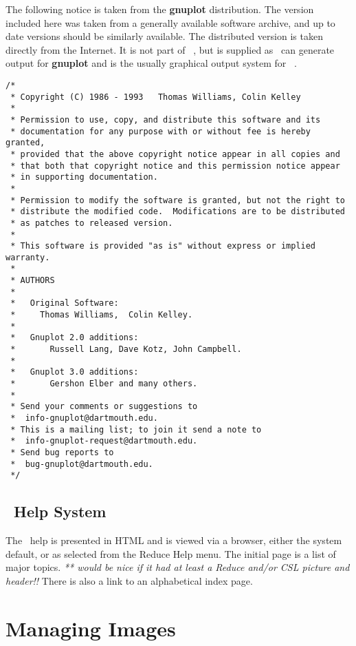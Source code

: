 The following notice is taken from the {\bf gnuplot} distribution.  The
version included here was taken from a generally available software
archive, and up to date versions should be similarly available.  
The distributed version is taken directly from the Internet.  It is not
part of \REDUCE\ , but is supplied as \REDUCE\  can generate output for {\bf
gnuplot} and is the usually graphical output system for \REDUCE\ .

{\small
\begin{verbatim}
/*
 * Copyright (C) 1986 - 1993   Thomas Williams, Colin Kelley
 *
 * Permission to use, copy, and distribute this software and its
 * documentation for any purpose with or without fee is hereby granted,
 * provided that the above copyright notice appear in all copies and
 * that both that copyright notice and this permission notice appear
 * in supporting documentation.
 *
 * Permission to modify the software is granted, but not the right to
 * distribute the modified code.  Modifications are to be distributed
 * as patches to released version.
 *
 * This software is provided "as is" without express or implied warranty.
 *
 * AUTHORS
 *
 *   Original Software:
 *     Thomas Williams,  Colin Kelley.
 *
 *   Gnuplot 2.0 additions:
 *       Russell Lang, Dave Kotz, John Campbell.
 *
 *   Gnuplot 3.0 additions:
 *       Gershon Elber and many others.
 *
 * Send your comments or suggestions to
 *  info-gnuplot@dartmouth.edu.
 * This is a mailing list; to join it send a note to
 *  info-gnuplot-request@dartmouth.edu.
 * Send bug reports to
 *  bug-gnuplot@dartmouth.edu.
 */
\end{verbatim}
}

\subsection{\REDUCE\  Help System}
\label{help}

The \REDUCE\ help is presented in HTML and is viewed via a browser,
either the system default, or as selected from the Reduce Help menu.
The initial page is a list of major topics.
{\em *** would be nice if it had at least a Reduce and/or CSL picture
  and header!!}
There is also a link to an alphabetical index page.


\section{Managing Images}
\label{OptO}

